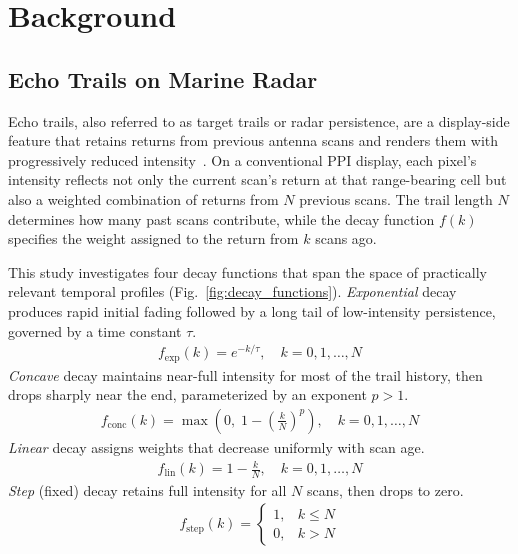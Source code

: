\documentclass[colorlinks,upint,balance]{asmeconf}
\begin{document}
\section{Background}

\subsection{Echo Trails on Marine Radar}

Echo trails, also referred to as target trails or radar persistence, are a display-side feature that retains returns from previous antenna scans and renders them with progressively reduced intensity~\cite{Briggs2004RadarDisplay}. On a conventional PPI display, each pixel's intensity reflects not only the current scan's return at that range-bearing cell but also a weighted combination of returns from $N$ previous scans. The trail length $N$ determines how many past scans contribute, while the decay function $f(k)$ specifies the weight assigned to the return from $k$ scans ago.

This study investigates four decay functions that span the space of practically relevant temporal profiles (Fig.~\ref{fig:decay_functions}). \textit{Exponential} decay produces rapid initial fading followed by a long tail of low-intensity persistence, governed by a time constant $\tau$.
\begin{align}
	f_{\mathrm{exp}}(k) = e^{-k/\tau}, \quad k = 0, 1, \ldots, N
	\label{eq:exp_decay}
\end{align}
\textit{Concave} decay maintains near-full intensity for most of the trail history, then drops sharply near the end, parameterized by an exponent $p > 1$.
\begin{align}
	f_{\mathrm{conc}}(k) = \max\!\left(0,\; 1 - \left(\frac{k}{N}\right)^{p}\right), \quad k = 0, 1, \ldots, N
	\label{eq:concave_decay}
\end{align}
\textit{Linear} decay assigns weights that decrease uniformly with scan age.
\begin{align}
	f_{\mathrm{lin}}(k) = 1 - \frac{k}{N}, \quad k = 0, 1, \ldots, N
	\label{eq:linear_decay}
\end{align}
\textit{Step} (fixed) decay retains full intensity for all $N$ scans, then drops to zero.
\begin{align}
	f_{\mathrm{step}}(k) = \begin{cases} 1, & k \leq N \\ 0, & k > N \end{cases}
	\label{eq:step_decay}
\end{align}
\end{document}
